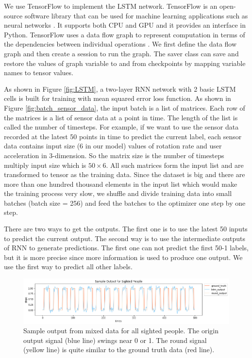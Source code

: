 \documentclass[11pt]{article}
\begin{document}
We use TensorFlow to implement the LSTM network. TensorFlow is an open-source software library that can be used for machine learning applications such as neural networks \cite{wiki:tensorflow}. It supports both CPU and GPU and it provides an interface in Python. TensorFlow uses a data flow graph to represent computation in terms of the dependencies between individual operations \cite{tensorflow.org}. We first define the data flow graph and then create a session to run the graph. The saver class can save and restore the values of graph variable to and from checkpoints by mapping variable names to tensor values.

As shown in Figure \ref{fig:LSTM}, a two-layer RNN network with 2 basic LSTM cells is built for training with mean squared error loss function. 
As shown in Figure \ref{fig:batch_sensor_data}, the input batch is a list of matrices. Each row of the matrices is a list of sensor data at a point in time. The length of the list is called the number of timesteps.
For example, if we want to use the sensor data recorded at the latest 50 points in time to predict the current label, each sensor data contains input size ($6$ in our model) values of rotation rate and user acceleration in 3-dimension. So the matrix size is the number of timesteps multiply input size which is $50 \times 6$. All such matrices form the input list and are transformed to tensor as the training data. Since the dataset is big and there are more than one hundred thousand elements in the input list which would make the training process very slow, we shuffle and divide training data into small batches (batch size = 256) and feed the batches to the optimizer one step by one step.

There are two ways to get the outputs. The first one is to use the latest 50 inputs to predict the current output. The second way is to use the intermediate outputs of RNN to generate predictions. The first one can not predict the first 50-1 labels, but it is more precise since more information is used to produce one output. We use the first way to predict all other labels.


\begin{figure}[ht]
\centering
\includegraphics[scale=0.5]{output_sighted}
\caption{Sample output from mixed data for all sighted people. The origin output signal (blue line) swings near 0 or 1. The round signal (yellow line) is quite similar to the ground truth data (red line).}
\label{fig:output_sighted}
\end{figure}
\end{document}
